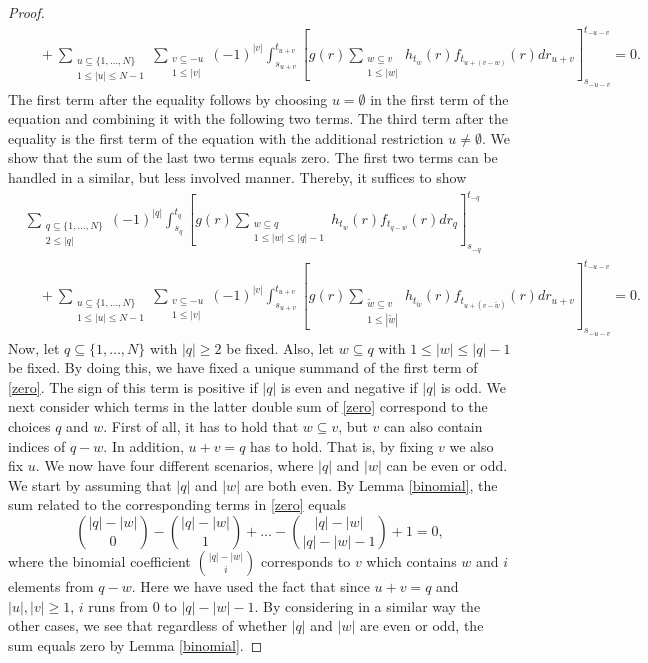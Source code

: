 \documentclass[10pt,a4paper]{amsart}
\begin{document}
\begin{proof}
\begin{equation*}
\begin{split}
&\quad+ \sum_{\substack{u\subseteq\{1,\dots,N\}\\
1 \leq |u|\leq N-1}} \sum_{\substack{v\subseteq -u\\ 1\leq |v|}} (-1)^{|v|} \int_{s_{u+v}}^{t_{u+v}} \left[g(r) \sum_{\substack{w\subseteq v\\1\leq |w|}} h_{t_w}(r) f_{t_{u+(v-w)}}(r) dr_{u+v}\right]_{s_{-u-v}}^{t_{-u-v}} =0.
\end{split}
\end{equation*}
The first term after the equality follows by choosing $u = \emptyset$ in the first term of the equation and combining it with the following two terms. The third term after the equality is the first term of the equation with the additional restriction $u \neq \emptyset$. 
We show that the sum of the last two terms equals zero. The first two terms can be handled in a similar, but less involved manner. Thereby, it suffices to show
\begin{equation}
\label{zero}
\begin{split}
&\sum_{\substack{q\subseteq \{1,\dots,N\} \\ 2 \leq |q|}}(-1)^{|q|} \int_{s_q}^{t_q} [g(r)\sum_{\substack{w\subseteq q\\ 1\leq |w| \leq |q|-1}}h_{t_w}(r)f_{t_{q-w}}(r) dr_q]_{s_{-q}}^{t_{-q}}\\
&\quad+ \sum_{\substack{u\subseteq\{1,\dots,N\}\\
1 \leq |u|\leq N-1}} \sum_{\substack{v\subseteq -u\\ 1\leq |v|}} (-1)^{|v|} \int_{s_{u+v}}^{t_{u+v}} \left[g(r) \sum_{\substack{\tilde{w}\subseteq v\\1\leq |\tilde{w}|}} h_{t_{\tilde{w}}}(r) f_{t_{u+(v-\tilde{w})}}(r) dr_{u+v}\right]_{s_{-u-v}}^{t_{-u-v}} = 0.
\end{split}
\end{equation}
Now, let $q \subseteq \{1,\dots,N\}$ with $|q|\geq 2$ be fixed. Also, let $w\subseteq q$ with $1\leq |w|\leq |q|-1$ be fixed. By doing this, we have fixed a unique summand of the first term of \eqref{zero}. The sign of this term is positive if $|q|$ is even and negative if $|q|$ is odd. We next consider which terms in the latter double sum of \eqref{zero} correspond to the choices $q$ and $w$. First of all, it has to hold that $w\subseteq v$, but $v$ can also contain indices of $q-w$. In addition, $u+v=q$ has to hold. That is, by fixing $v$ we also fix $u$. We now have four different scenarios, where $|q|$ and $|w|$ can be even or odd. We start by assuming that $|q|$ and $|w|$ are both even. By Lemma \ref{binomial}, the sum related to the corresponding terms in \eqref{zero} equals
\begin{equation}
\label{zero1}
\binom{|q|-|w|}{0} - \binom{|q|-|w|}{1}+\dots -\binom{|q|-|w|}{|q|-|w|-1} + 1 = 0,
\end{equation}
where the binomial coefficient $\binom{|q|-|w|}{i}$ corresponds to $v$ which contains $w$ and $i$ elements from $q-w$. Here we have used the fact that since $u+v = q$ and $|u|,|v| \geq 1$, $i$ runs from 0 to $|q| - |w| -1$. By considering in a similar way the other cases, we see that regardless of whether $|q|$ and $|w|$ are even or odd, the sum equals zero by Lemma \ref{binomial}. 
\end{proof}
\end{document}
